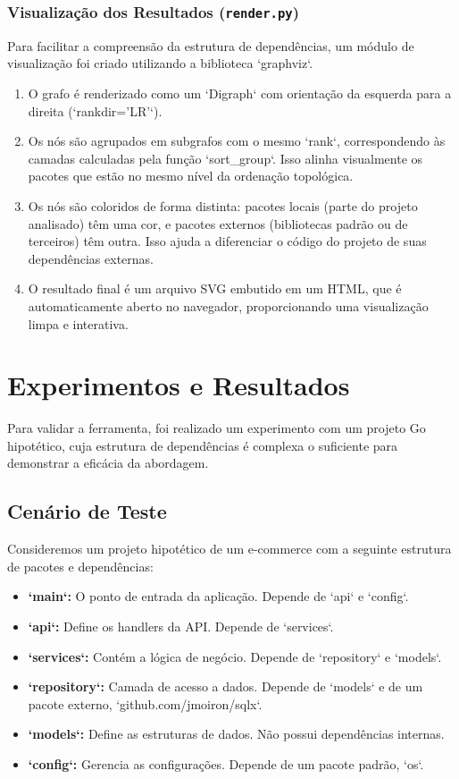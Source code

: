 \documentclass[12pt]{article}
\begin{document}
\subsubsection{Visualização dos Resultados (\texttt{render.py})}
Para facilitar a compreensão da estrutura de dependências, um módulo de visualização foi criado utilizando a biblioteca `graphviz`.
\begin{enumerate}
    \item O grafo é renderizado como um `Digraph` com orientação da esquerda para a direita (`rankdir='LR'`).
    \item Os nós são agrupados em subgrafos com o mesmo `rank`, correspondendo às camadas calculadas pela função `sort\_group`. Isso alinha visualmente os pacotes que estão no mesmo nível da ordenação topológica.
    \item Os nós são coloridos de forma distinta: pacotes locais (parte do projeto analisado) têm uma cor, e pacotes externos (bibliotecas padrão ou de terceiros) têm outra. Isso ajuda a diferenciar o código do projeto de suas dependências externas.
    \item O resultado final é um arquivo SVG embutido em um HTML, que é automaticamente aberto no navegador, proporcionando uma visualização limpa e interativa.
\end{enumerate}

\section{Experimentos e Resultados}
Para validar a ferramenta, foi realizado um experimento com um projeto Go hipotético, cuja estrutura de dependências é complexa o suficiente para demonstrar a eficácia da abordagem.

\subsection{Cenário de Teste}
Consideremos um projeto hipotético de um e-commerce com a seguinte estrutura de pacotes e dependências:

\begin{itemize}
    \item \textbf{`main`:} O ponto de entrada da aplicação. Depende de `api` e `config`.
    \item \textbf{`api`:} Define os handlers da API. Depende de `services`.
    \item \textbf{`services`:} Contém a lógica de negócio. Depende de `repository` e `models`.
    \item \textbf{`repository`:} Camada de acesso a dados. Depende de `models` e de um pacote externo, `github.com/jmoiron/sqlx`.
    \item \textbf{`models`:} Define as estruturas de dados. Não possui dependências internas.
    \item \textbf{`config`:} Gerencia as configurações. Depende de um pacote padrão, `os`.
\end{itemize}
\end{document}
